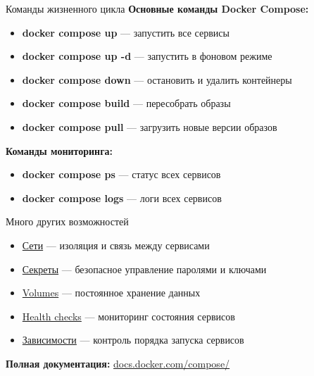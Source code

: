 \documentclass[aspectratio=169]{beamer}
\begin{document}
    \begin{frame}{Команды жизненного цикла}
        \textbf{Основные команды Docker Compose:}

        \begin{itemize}
            \item \textbf{docker compose up} — запустить все сервисы
            \item \textbf{docker compose up -d} — запустить в фоновом режиме
            \item \textbf{docker compose down} — остановить и удалить контейнеры
            \item \textbf{docker compose build} — пересобрать образы
            \item \textbf{docker compose pull} — загрузить новые версии образов
        \end{itemize}

        \vspace{0.2cm}

        \textbf{Команды мониторинга:}
        \begin{itemize}
            \item \textbf{docker compose ps} — статус всех сервисов
            \item \textbf{docker compose logs} — логи всех сервисов
        \end{itemize}
    \end{frame}

    \begin{frame}{Много других возможностей}
        \begin{itemize}
            \item \href{https://docs.docker.com/compose/compose-file/06-networks/}{Сети} — изоляция и связь между сервисами
            \item \href{https://docs.docker.com/compose/use-secrets/}{Секреты} — безопасное управление паролями и ключами
            \item \href{https://docs.docker.com/compose/compose-file/07-volumes/}{Volumes} — постоянное хранение данных
            \item \href{https://docs.docker.com/compose/compose-file/05-services/\#healthcheck}{Health checks} — мониторинг состояния сервисов
            \item \href{https://docs.docker.com/compose/compose-file/05-services/\#depends_on}{Зависимости} — контроль порядка запуска сервисов
        \end{itemize}
        \vspace{0.3cm}

        \textbf{Полная документация:} \href{https://docs.docker.com/compose/}{docs.docker.com/compose/}
    \end{frame}
\end{document}
